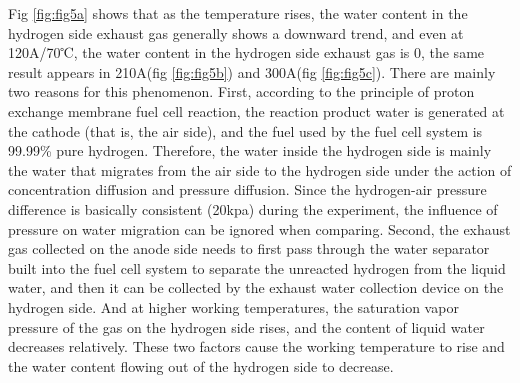 \par
Fig \ref{fig:fig5a} shows that as the temperature rises, the water content in the hydrogen side exhaust gas generally shows a downward trend, and even at 120A/70℃, the water content in the hydrogen side exhaust gas is 0, the same result appears in 210A(fig \ref{fig:fig5b}) and 300A(fig \ref{fig:fig5c}). There are mainly two reasons for this phenomenon.  First, according to the principle of proton exchange membrane fuel cell reaction, the reaction product water is generated at the cathode (that is, the air side), and the fuel used by the fuel cell system is 99.99\% pure hydrogen. Therefore, the water inside the hydrogen side is mainly the water that migrates from the air side to the hydrogen side under the action of concentration diffusion and pressure diffusion. Since the hydrogen-air pressure difference is basically consistent (20kpa) during the experiment, the influence of pressure on water migration can be ignored when comparing. Second, the exhaust gas collected on the anode side needs to first pass through the water separator built into the fuel cell system to separate the unreacted hydrogen from the liquid water, and then it can be collected by the exhaust water collection device on the hydrogen side. And at higher working temperatures, the saturation vapor pressure of the gas on the hydrogen side rises, and the content of liquid water decreases relatively. These two factors cause the working temperature to rise and the water content flowing out of the hydrogen side to decrease.

